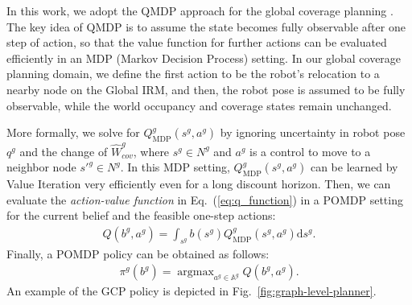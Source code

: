 \documentclass[letterpaper]{article} %
\newcommand{\phdone}[1]{} %
\newcommand{\argmax}{\mathop{\mathrm{argmax}}}
\begin{document}
\noindent
In this work, we adopt the QMDP approach for the global coverage planning \cite{littman1995learning}.
The key idea of QMDP is to assume the state becomes fully observable after one step of action, so that the value function for further actions can be evaluated efficiently in an MDP (Markov Decision Process) setting.
In our global coverage planning domain, we define the first action to be the robot's relocation to a nearby node on the Global IRM, and then, the robot pose is assumed to be fully observable, while the world occupancy and coverage states remain unchanged.


\phdone{QMDP Details}
More formally, we solve for $Q^g_{\mathrm{MDP}}(s^g, a^g)$ by ignoring uncertainty in robot pose $q^g$ and the change of $\hat{W}^g_{cov}$, where $s^g \in N^g$ and $a^g$ is a control to move to a neighbor node $s'^g \in N^g$.
In this MDP setting, $Q^g_{\mathrm{MDP}}(s^g, a^g)$ can be learned by Value Iteration very efficiently even for a long discount horizon.
%
Then, we can evaluate the \textit{action-value function} in Eq.~(\ref{eq:q_function}) in a POMDP setting for the current belief and the feasible one-step actions:
\begin{align}
  Q(b^g, a^g) = \int_{s^g} b(s^g) Q^g_{\mathrm{MDP}}(s^g, a^g) \mathrm{d}s^g.
\end{align}
%
Finally, a POMDP policy can be obtained as follows:
\begin{align}
  \pi^g(b^g) = \argmax_{a^g \in \mathbb{A}^g} Q(b^g, a^g).
\end{align}
%
An example of the GCP policy is depicted in Fig.~\ref{fig:graph-level-planner}.
\end{document}
